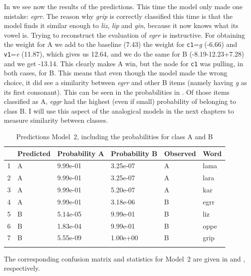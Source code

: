 In  we see now the results of the predictions. This time the model only made one mistake: \textit{egrr}. The reason why \textit{grip} is correctly classified this time is that the model finds it similar enough to \textit{liz}, \textit{lip} and \textit{gin}, because it now knows what its vowel is. Trying to reconstruct the evaluation of \textit{egrr} is instructive. For obtaining the weight for A we add to the baseline (7.43) the weight for \texttt{c1}=\textit{g} (-6.66) and \texttt{v1}=\textit{e} (11.87), which gives us 12.64, and we do the same for B (-8.19-12.23+7.28) and we get -13.14. This clearly makes A win, but the node for \texttt{c1} was pulling, in both cases, for B. This means that even though the model made the wrong choice, it did see a similarity between \textit{egrr} and other B items (namely having \textit{g} as its first consonant). This can be seen in the probabilities in . Of those items classified as A, \textit{eggr} had the highest (even if small) probability of belonging to class B. I will use this aspect of the analogical models in the next chapters to measure similarity between classes.

\begin{table}%
  \centering
  \begin{tabular}{llllll}
    \lsptoprule
      & Predicted & Probability A & Probability B & Observed & Word \\
    \midrule
    1 & A         & 9.99e-01      & 3.25e-07      & A        & lama \\
    2 & A         & 9.99e-01      & 3.25e-07      & A        & lara \\
    3 & A         & 9.99e-01      & 5.20e-07      & A        & kar  \\
    4 & A         & 9.99e-01      & 3.18e-06      & B        & egrr \\
    5 & B         & 5.14e-05      & 9.99e-01      & B        & liz  \\
    6 & B         & 1.83e-04      & 9.99e-01      & B        & oppe \\
    7 & B         & 5.55e-09      & 1.00e+00      & B        & grip \\
    \lspbottomrule
  \end{tabular}
  \caption{Predictions Model~2, including the probabilities for class A and B}\label{tab:preds-model2}
\end{table}

The corresponding confusion matrix and statistics for Model~2 are given in  and , respectively.

